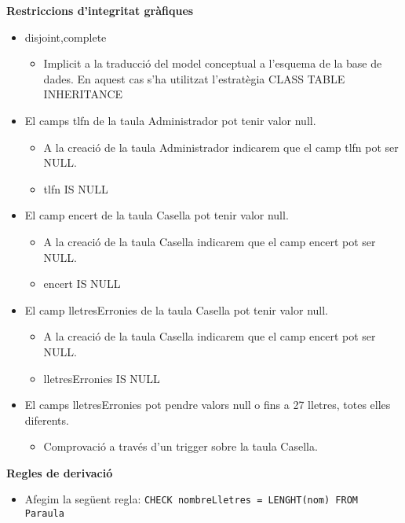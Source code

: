 \textbf{Restriccions d'integritat gràfiques}
\begin{itemize}
	\item {disjoint,complete}
		\begin{itemize}
			\item Implicit a la traducció del model conceptual a l’esquema de la base de dades. En aquest cas s’ha utilitzat l’estratègia CLASS TABLE INHERITANCE
		\end{itemize}
	\item El camps tlfn de la taula Administrador pot tenir valor null.
		\begin{itemize}
			\item A la creació de la taula Administrador indicarem que el camp tlfn pot ser NULL.
			\item tlfn IS NULL
		\end{itemize}
	\item El camp encert de la taula Casella pot tenir valor null.
		\begin{itemize}
			\item A la creació de la taula Casella indicarem que el camp encert pot ser NULL.
			\item encert IS NULL
		\end{itemize}
	\item El camp lletresErronies de la taula Casella pot tenir valor null.
		\begin{itemize}
			\item A la creació de la taula Casella indicarem que el camp encert pot ser NULL.
			\item lletresErronies IS NULL
		\end{itemize}
	\item El camps lletresErronies pot pendre valors null o fins a 27 lletres, totes elles diferents.
		\begin{itemize}
			\item Comprovació a través d’un trigger sobre la taula Casella.
		\end{itemize}
\end{itemize}

\textbf{Regles de derivació}
\begin{itemize}
	\item Afegim la següent regla: \texttt{CHECK nombreLletres = LENGHT(nom) FROM Paraula}
\end{itemize}